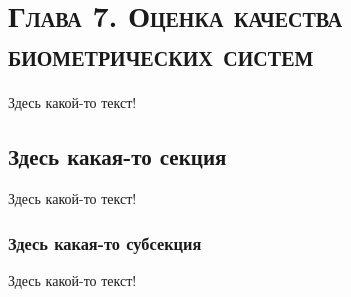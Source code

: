 \documentclass[12pt]{book}
\begin{document}
\chapter*{\textsc{Глава 7. Оценка качества биометрических систем}}

\thispagestyle{fancy}

\large{Здесь какой-то текст!}

\section{Здесь какая-то секция}

\large{Здесь какой-то текст!}

\subsection{Здесь какая-то субсекция}

\large{Здесь какой-то текст!}
\end{document}
